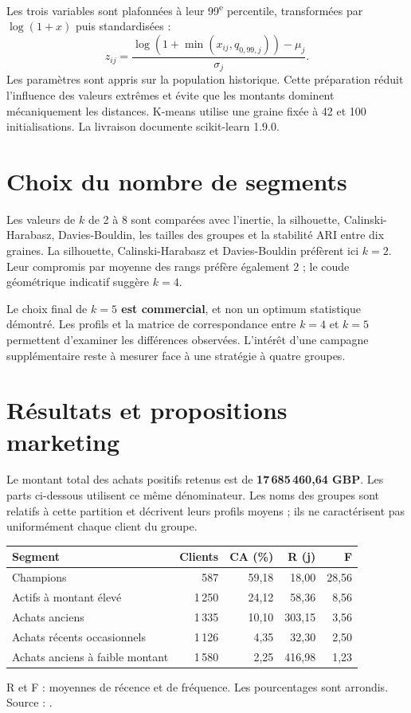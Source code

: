 \documentclass[11pt,a4paper]{article}
\newcommand{\fichier}[1]{\texttt{\small\detokenize{#1}}}
\begin{document}
Les trois variables sont plafonnées à leur 99\textsuperscript{e} percentile,
transformées par $\log(1+x)$ puis standardisées :
\[
 z_{ij}=\frac{\log\!\left(1+\min(x_{ij},q_{0,99,j})\right)-\mu_j}{\sigma_j}.
\]
Les paramètres sont appris sur la population historique. Cette préparation
réduit l'influence des valeurs extrêmes et évite que les montants dominent
mécaniquement les distances. K-means utilise une graine fixée à 42 et
100 initialisations. La livraison documente scikit-learn 1.9.0.

\section{Choix du nombre de segments}
Les valeurs de $k$ de 2 à 8 sont comparées avec l'inertie, la silhouette,
Calinski-Harabasz, Davies-Bouldin, les tailles des groupes et la stabilité
ARI entre dix graines. La silhouette, Calinski-Harabasz et Davies-Bouldin
préfèrent ici \textbf{$k=2$}. Leur compromis par moyenne des rangs préfère
également 2 ; le coude géométrique indicatif suggère \textbf{$k=4$}.

Le choix final de \textbf{$k=5$ est commercial}, et non un optimum statistique
démontré. Les profils et la matrice de correspondance entre $k=4$ et $k=5$
permettent d'examiner les différences observées. L'intérêt d'une campagne
supplémentaire reste à mesurer face à une stratégie à quatre groupes.

\newpage
\section{Résultats et propositions marketing}
Le montant total des achats positifs retenus est de
\textbf{17\,685\,460,64 GBP}. Les parts ci-dessous utilisent ce même dénominateur.
Les noms des groupes sont relatifs à cette partition et décrivent leurs profils
moyens ; ils ne caractérisent pas uniformément chaque client du groupe.

\begin{center}
\small
\renewcommand{\arraystretch}{1.35}
\begin{tabularx}{\textwidth}{@{}Yrrrr@{}}
\toprule
\textbf{Segment} & \textbf{Clients} & \textbf{CA (\%)} & \textbf{R (j)} & \textbf{F} \\
\midrule
Champions & 587 & 59,18 & 18,00 & 28,56 \\
Actifs à montant élevé & 1\,250 & 24,12 & 58,36 & 8,56 \\
Achats anciens & 1\,335 & 10,10 & 303,15 & 3,56 \\
Achats récents occasionnels & 1\,126 & 4,35 & 32,30 & 2,50 \\
Achats anciens à faible montant & 1\,580 & 2,25 & 416,98 & 1,23 \\
\bottomrule
\end{tabularx}
\end{center}
{\small R et F : moyennes de récence et de fréquence. Les pourcentages sont arrondis.
Source : \fichier{tableau_synthese_segments.csv}.}
\end{document}
